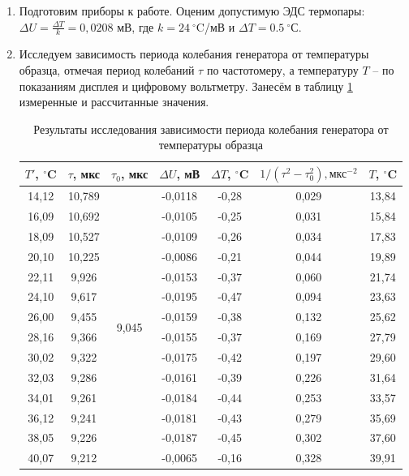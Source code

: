 \documentclass[a4paper, 12pt]{article}
\begin{document}
    \begin{enumerate}
        \item Подготовим приборы к работе. Оценим допустимую ЭДС термопары: $\Delta U = \frac{\Delta T}{k} = 0,0208$ мВ, где $k = 24 \: ^\circ$C/мВ и $\Delta T = 0.5 \: ^{\circ}$С.
        
        \item Исследуем зависимость периода колебания генератора от температуры образца, отмечая период колебаний $\tau$ по частотомеру, а температуру $T$ -- по показаниям дисплея и цифровому вольтметру. Занесём в таблицу \ref{table:results} измеренные и рассчитанные значения.

        \begin{table}[H]
            \centering
            \begin{tabular}{|c|c|c|c|c|c|c|}
            \hline
            $T'$, $^\circ$C  & $\tau$, мкс & $\tau_0$, мкс & $\Delta U$, мВ & $\Delta T$, $^\circ$C & $1/(\tau^2 - \tau_0^2), \text{мкс}^{-2} $ & $T$, $^\circ$C \\ \hline
            14,12 & 10,789 & \multirow{14}{*}{9,045} & -0,0118 & -0,28 & 0,029 & 13,84 \\ \cline{1-2} \cline{4-7} 
            16,09 & 10,692 &  & -0,0105 & -0,25 & 0,031 & 15,84 \\ \cline{1-2} \cline{4-7} 
            18,09 & 10,527 &  & -0,0109 & -0,26 & 0,034 & 17,83 \\ \cline{1-2} \cline{4-7} 
            20,10 & 10,225 &  & -0,0086 & -0,21 & 0,044 & 19,89 \\ \cline{1-2} \cline{4-7} 
            22,11 & 9,926 &  & -0,0153 & -0,37 & 0,060 & 21,74 \\ \cline{1-2} \cline{4-7} 
            24,10 & 9,617 &  & -0,0195 & -0,47 & 0,094 & 23,63 \\ \cline{1-2} \cline{4-7} 
            26,00 & 9,455 &  & -0,0159 & -0,38 & 0,132 & 25,62 \\ \cline{1-2} \cline{4-7} 
            28,16 & 9,366 &  & -0,0155 & -0,37 & 0,169 & 27,79 \\ \cline{1-2} \cline{4-7} 
            30,02 & 9,322 &  & -0,0175 & -0,42 & 0,197 & 29,60 \\ \cline{1-2} \cline{4-7} 
            32,03 & 9,286 &  & -0,0161 & -0,39 & 0,226 & 31,64 \\ \cline{1-2} \cline{4-7} 
            34,01 & 9,261 &  & -0,0184 & -0,44 & 0,253 & 33,57 \\ \cline{1-2} \cline{4-7} 
            36,12 & 9,241 &  & -0,0181 & -0,43 & 0,279 & 35,69 \\ \cline{1-2} \cline{4-7} 
            38,05 & 9,226 &  & -0,0187 & -0,45 & 0,302 & 37,60 \\ \cline{1-2} \cline{4-7} 
            40,07 & 9,212 &  & -0,0065 & -0,16 & 0,328 & 39,91 \\ \hline
            \end{tabular}
            \caption{Результаты исследования зависимости периода колебания генератора от температуры образца}
            \label{table:results}
        \end{table}
    

\end{enumerate}
\end{document}

